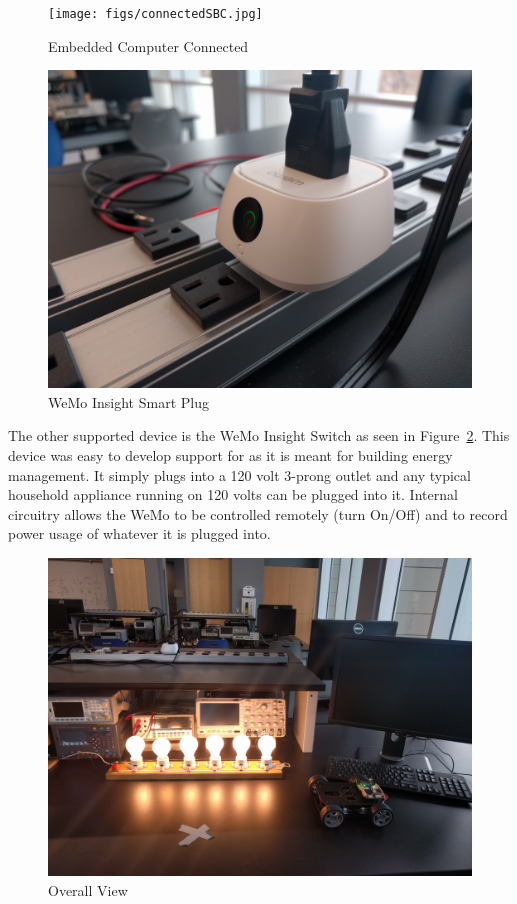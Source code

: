 \begin{figure}[H]
    \centering
    \texttt{[image: figs/connectedSBC.jpg]}
    \caption{Embedded Computer Connected}
    \label{fig:connected_bb}
\end{figure}

\begin{figure}[H]
    \centering
    \includegraphics[scale=0.085]{figs/wemoView.jpg}
    \caption{WeMo Insight Smart Plug}
    \label{fig:wemo}
\end{figure}

The other supported device is the WeMo Insight Switch as seen in Figure~\ref{fig:wemo}. This device was easy to develop support for as it is meant for building energy management. It simply plugs into a 120 volt 3-prong outlet and any typical household appliance running on 120 volts can be plugged into it. Internal circuitry allows the WeMo to be controlled remotely (turn On/Off) and to record power usage of whatever it is plugged into.

\begin{figure}[H]
    \centering
    \includegraphics[scale=0.1]{figs/overallView.jpg}
    \caption{Overall View}
    \label{fig:overallView}
\end{figure}

